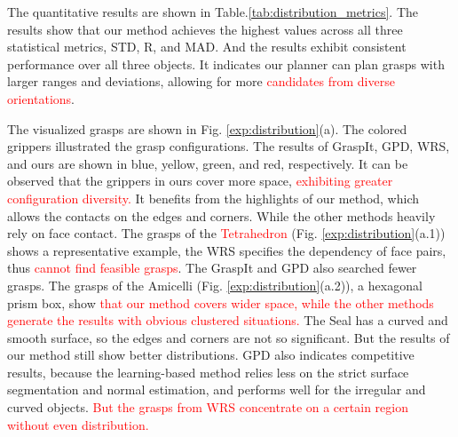 \documentclass[journal]{IEEEtran}
\newcommand{\rev}[1]{\textcolor{red}{#1}}
\begin{document}
The quantitative results are shown in Table.\ref{tab:distribution_metrics}. The results show that our method achieves the highest values across all three statistical metrics, STD, R, and MAD. And the results exhibit consistent performance over all three objects. It indicates our planner can plan grasps with larger ranges and deviations, allowing for more \rev{candidates from diverse orientations}. 

The visualized grasps are shown in Fig. \ref{exp:distribution}(a). The colored grippers illustrated the grasp configurations. The results of GraspIt, GPD, WRS, and ours are shown in blue, yellow, green, and red, respectively. It can be observed that the grippers in ours cover more space, \rev{exhibiting greater configuration diversity.} It benefits from the highlights of our method, which allows the contacts on the edges and corners. While the other methods heavily rely on face contact. The grasps of the \rev{Tetrahedron} (Fig. \ref{exp:distribution}(a.1)) shows a representative example, the WRS specifies the dependency of face pairs, thus \rev{cannot find feasible grasps}. The GraspIt and GPD also searched fewer grasps. The grasps of the Amicelli (Fig. \ref{exp:distribution}(a.2)), a hexagonal prism box, show \rev{that our method covers wider space, while the other methods generate the results with obvious clustered situations.} The Seal has a curved and smooth surface, so the edges and corners are not so significant. But the results of our method still show better distributions. GPD also indicates competitive results, because the learning-based method relies less on the strict surface segmentation and normal estimation, and performs well for the irregular and curved objects. \rev{But the grasps from WRS concentrate on a certain region without even distribution.}
\end{document}
